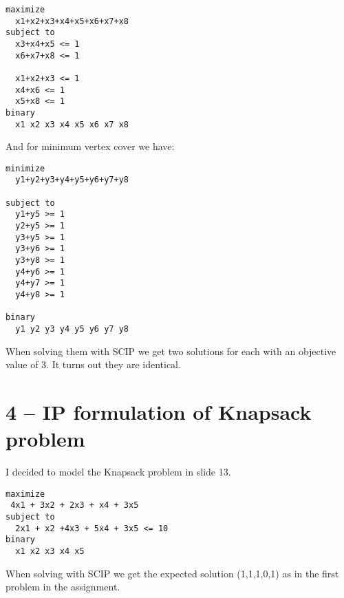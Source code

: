 \documentclass[12pt]{report}
\begin{document}
\begin{verbatim}
maximize
  x1+x2+x3+x4+x5+x6+x7+x8
subject to
  x3+x4+x5 <= 1
  x6+x7+x8 <= 1

  x1+x2+x3 <= 1
  x4+x6 <= 1
  x5+x8 <= 1
binary
  x1 x2 x3 x4 x5 x6 x7 x8
\end{verbatim}

And for minimum vertex cover we have:

\begin{verbatim}
minimize
  y1+y2+y3+y4+y5+y6+y7+y8

subject to
  y1+y5 >= 1
  y2+y5 >= 1
  y3+y5 >= 1
  y3+y6 >= 1
  y3+y8 >= 1
  y4+y6 >= 1
  y4+y7 >= 1
  y4+y8 >= 1

binary
  y1 y2 y3 y4 y5 y6 y7 y8
\end{verbatim}

When solving them with SCIP we get two solutions for each with an objective value of 3. It turns out they are identical. 


\section*{4 -- IP formulation of Knapsack problem}

I decided to model the Knapsack problem in slide 13.


\begin{verbatim}
maximize
 4x1 + 3x2 + 2x3 + x4 + 3x5 
subject to
  2x1 + x2 +4x3 + 5x4 + 3x5 <= 10
binary
  x1 x2 x3 x4 x5
\end{verbatim}

When solving with SCIP we get the expected solution (1,1,1,0,1) as in the first problem in the assignment.
\end{document}
